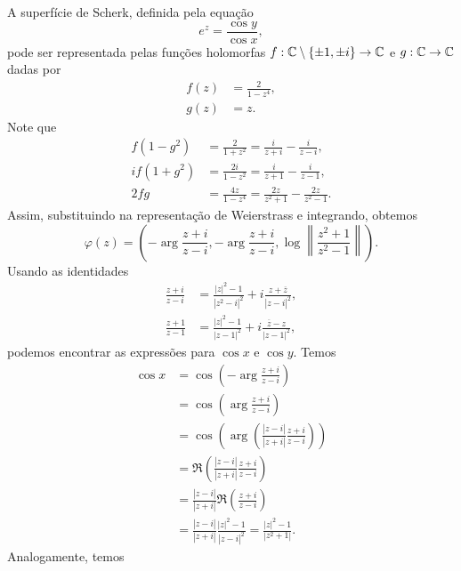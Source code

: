 \begin{exemplo}
	A superfície de Scherk, definida pela equação
	\begin{equation*}
	e^z = \frac{\cos y}{\cos x},
	\end{equation*}
	pode ser representada pelas funções holomorfas $f: \mathbb{C} \setminus \{\pm 1, \pm i \} \rightarrow \mathbb{C}$ e $g: \mathbb{C} \rightarrow \mathbb{C}$ dadas por
	\begin{align*}
	f(z) &= \frac{2}{1 - z^4}, \\
	g(z) &= z.
	\end{align*}
	Note que
	\begin{align*}
	f (1 - g^2) &= \frac{2}{1 + z^2} = \frac{i}{z + i} - \frac{i}{z - i}, \\
	i f (1 + g^2) &= \frac{2i}{1 - z^2} = \frac{i}{z + 1} - \frac{i}{z - 1}, \\
	2fg &= \frac{4z}{1 - z^4} = \frac{2z}{z^2 + 1} - \frac{2z}{z^2 - 1}.
	\end{align*}
	Assim, substituindo na representação de Weierstrass e integrando, obtemos
	\begin{equation*}
	\varphi(z) = \left( -\arg \frac{z + i}{z - i}, -\arg \frac{z + i}{z - i}, \log \left\| \frac{z^2 + 1}{z^2 - 1} \right\| \right).
	\end{equation*}
	Usando as identidades
	\begin{align*}
	\frac{z + i}{z - i} &= \frac{|z|^2 - 1}{|z^2 - i|^2} + i \frac{z + \overline{z}}{|z - i|^2}, \\
	\frac{z + 1}{z - 1} &= \frac{|z|^2 - 1}{|z - 1|^2} + i \frac{\overline{z} - z}{|z - 1|^2},
	\end{align*}
	podemos encontrar as expressões para $\cos x$ e $\cos y$. Temos
	\begin{align*}
	\cos x &= \cos \left( -\arg \frac{z + i}{z - i} \right) \\
	&= \cos \left( \arg \frac{z + i}{z - i} \right) \\
	&= \cos \left( \arg \left( \frac{|z - i|}{|z + i|} \frac{z + i}{z - i} \right) \right) \\
	&= \Re \left( \frac{|z - i|}{|z + i|} \frac{z + i}{z - i} \right) \\
	&= \frac{|z - i|}{|z + i|} \Re \left( \frac{z + i}{z - i} \right) \\
	&= \frac{|z - i|}{|z + i|} \frac{|z|^2 - 1}{|z - i|^2} = \frac{|z|^2 - 1}{|z^2 + 1|}.
	\end{align*}
	Analogamente, temos
	\begin{align*}

\end{align*}
\end{exemplo}
